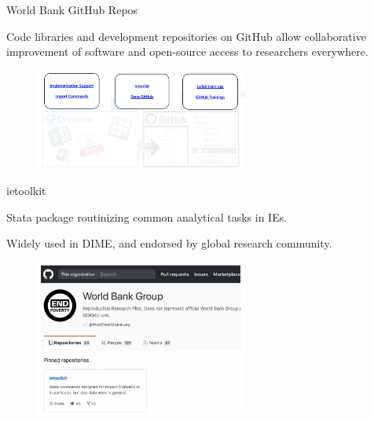 \documentclass[aspectratio=169]{beamer}
\begin{document}
\begin{frame}[fragile]{World Bank GitHub Repos}
\begin{multicols}{2}	
	
Code libraries and development repositories on GitHub allow collaborative improvement of software and open-source access to researchers everywhere.
	
	\begin{figure}
		\centering
		\includegraphics[width=70mm, right]{img/Resources}
	\end{figure}
	
\end{multicols}
\end{frame}

\begin{frame}[fragile]{ietoolkit}
\begin{multicols}{2}	
	
	Stata package routinizing common analytical tasks in IEs.
	
	Widely used in DIME, and endorsed by global research community.
	
	\begin{figure}
		\centering
		\includegraphics[width=70mm, right]{img/Resources4}
	\end{figure}
	
\end{multicols}
\end{frame}
\end{document}
